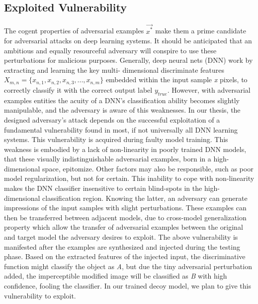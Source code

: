 \documentclass[grad,lot,lof,11pt,oneside,onehalfspace]{RUthesis}
\begin{document}
\subsection{Exploited Vulnerability}
The cogent properties of adversarial examples \textit{$ \vec{x^{*}}$} make them a prime candidate for adversarial attacks on deep learning systems.  It should be anticipated that an ambitious and
equally resourceful adversary will conspire to use these perturbations for malicious purposes.  Generally, deep neural nets (DNN) work by extracting and learning the key multi-
dimensional discriminate features \textit{$X_{m,n} =\{x_{n,1},x_{n,2}, x_{n,3},...,x_{n,m}\}$}
embedded within the input sample \textit{x} pixels, to correctly classify it with the correct output label \textit{$y_{true}$}. However, with adversarial examples entities the acuity of a DNN’s classification ability becomes slightly manipulable, and the adversary is aware of this weaknesses.
\newline
In our thesis, the designed adversary's attack depends on the successful exploitation of a
fundamental vulnerability found in most, if not universally all DNN learning systems.
This vulnerability is acquired during faulty model training.  This weakness is embodied by a lack of non-linearity in poorly trained DNN models, that these visually indistinguishable  adversarial  examples,  born  in  a  high-dimensional  space,  epitomize.   Other
factors may also be responsible, such as poor model regularization, but not for certain. This inability to cope with non-linearity makes the DNN classifier insensitive to certain blind-spots in the high-dimensional classification region. Knowing the latter, an adversary can generate impressions of the input samples with slight perturbations.  These examples can then be transferred between adjacent models, due to cross-model generalization property which allow the transfer of adversarial examples between the original and target model the adversary desires to exploit. The above vulnerability is manifested after the examples are synthesized and injected during the testing phase.  Based on the extracted features of the injected input,  the discriminative function might classify the object as \textit{A}, but due the tiny adversarial perturbation
added, the imperceptible modified image will be classified as \textit{B} with high confidence, fooling the classifier. In our trained decoy model, we plan to give this vulnerability to exploit. 
\end{document}
